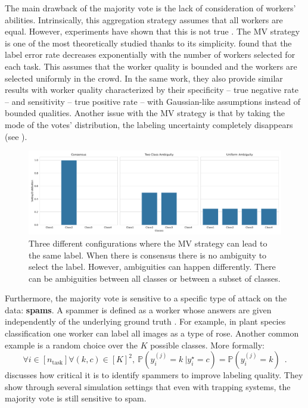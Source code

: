 The main drawback of the majority vote is the lack of consideration of workers' abilities.
Intrinsically, this aggregation strategy assumes that all workers are equal.
However, experiments have shown that this is not true \citep{snow_cheap_2008,vuurens2011much}.
The MV strategy is one of the most theoretically studied thanks to its simplicity.
\citet{wang2015crowdsourcing} found that the label error rate decreases exponentially with the number of workers selected for each task. This assumes that the worker quality is bounded and the workers are selected uniformly in the crowd.
In the same work, they also provide similar results with worker quality characterized by their specificity -- true negative rate -- and sensitivity -- true positive rate -- with Gaussian-like assumptions instead of bounded qualities.
Another issue with the MV strategy is that by taking the mode of the votes' distribution, the labeling uncertainty completely disappears (see ).

\begin{figure}[htb]
    \centering
    \includegraphics[width=.96\textwidth]{chapters/images/ambiguity.pdf}
    \caption{Three different configurations where the MV strategy can lead to the same label. When there is consensus there is no ambiguity to select the label. However, ambiguities can happen differently. There can be ambiguities between all classes or between a subset of classes.}
    \label{fig:confusion-types}
\end{figure}

Furthermore, the majority vote is sensitive to a specific type of attack on the data: \textbf{spams}.
A spammer is defined as a worker whose answers are given independently of the underlying ground truth \citep{raykar_ranking_2011}. For example, in plant species classification one worker can label all images as a type of rose. Another common example is a random choice over the $K$ possible classes. More formally:
\begin{equation}\label{eq:spammer}
    \forall i \in [n_\text{task}] \forall (k,c) \in [K]^2,\ \mathbb{P}(y_i^{(j)} = k\ | y_i^\star=c) = \mathbb{P}(y_i^{(j)} = k) \enspace.
\end{equation}
\citet{vuurens2011much} discusses how critical it is to identify spammers to improve labeling quality. They show through several simulation settings that even with trapping systems, the majority vote is still sensitive to spam.

